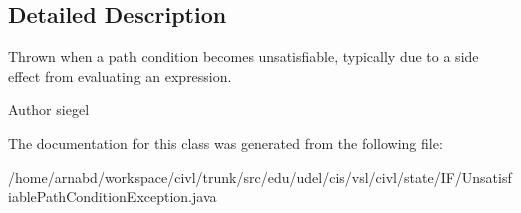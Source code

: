 \subsection{Detailed Description}
Thrown when a path condition becomes unsatisfiable, typically due to a side effect from evaluating an expression. 

\begin{DoxyAuthor}{Author}
siegel 
\end{DoxyAuthor}


The documentation for this class was generated from the following file\+:\begin{DoxyCompactItemize}
\item 
/home/arnabd/workspace/civl/trunk/src/edu/udel/cis/vsl/civl/state/\+I\+F/Unsatisfiable\+Path\+Condition\+Exception.\+java\end{DoxyCompactItemize}
